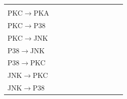 \documentclass[a4paper,pdf]{article}
\newcommand{\cmark}{\color{green}{\ding{51}}}%
\begin{document}
\begin{table}[!ht]
{{\begin{tabular}{l|ccccc|ccccc}
\cmark& &\\
PKC$\to$PKA   &              & \cmark & \cmark &  
            &              &              & \cmark &
& &\\
PKC$\to$P38   & \cmark & \cmark & \cmark & 
\cmark &              & \cmark &  \cmark & 
\cmark& &\\
PKC$\to$JNK   & \cmark & \cmark & \cmark &
\cmark & \cmark & \cmark &  \cmark &
\cmark &  & \cmark\\
P38$\to$JNK   &              &              &              &
             &              & \cmark &      &
 & \cmark  & \cmark  \\
P38$\to$PKC   &              &              &              & 
            &              & \cmark &          &
& \cmark  & \cmark\\
JNK$\to$PKC   &              &              &              & 
           &              & \cmark &              &
& &\\
JNK$\to$P38   &              &              &              & 
\cmark &              & \cmark &             &
& &\\
\hline
\end{tabular}}

}
\end{table} 
\end{document}
